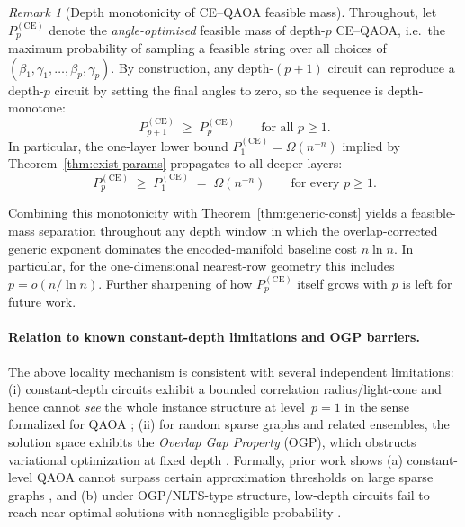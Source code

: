 \documentclass[a4paper,onecolumn,11pt,unpublished]{quantumarticle}
\theoremstyle{remark}
\newtheorem{remark}[theorem]{Remark}
\begin{document}
\begin{remark}[Depth monotonicity of CE--QAOA feasible mass]
\label{rem:ce-depth}
Throughout, let $P_p^{\mathrm{(CE)}}$ denote the \emph{angle-optimised}
feasible mass of depth-$p$ CE--QAOA, i.e.\ the maximum probability of
sampling a feasible string over all choices of $(\beta_1,\gamma_1,\dots,\beta_p,\gamma_p)$.
By construction, any depth-$(p{+}1)$ circuit can reproduce a depth-$p$ circuit by setting the final angles to zero, so the sequence is depth-monotone:
\[
  P_{p+1}^{\mathrm{(CE)}} \;\ge\; P_p^{\mathrm{(CE)}}\qquad\text{for all }p\ge 1.
\]
In particular, the one-layer lower bound
$P_{1}^{\mathrm{(CE)}} = \Omega(n^{-n})$ implied by Theorem~\ref{thm:exist-params} propagates to all deeper layers:
\[
  P_p^{\mathrm{(CE)}} \;\ge\; P_{1}^{\mathrm{(CE)}}
  \;=\; \Omega(n^{-n})
  \qquad\text{for every } p\ge 1.
\]

Combining this monotonicity with Theorem~\ref{thm:generic-const} yields a feasible-mass separation throughout any depth window in which the overlap-corrected generic exponent dominates the encoded-manifold baseline cost \(n\ln n\). In particular, for the one-dimensional nearest-row geometry this includes
\(p=o(n/\ln n)\).  Further sharpening of how \(P_p^{(\mathrm{CE})}\) itself grows with \(p\) is left for future work.
\end{remark}


\paragraph{Relation to known constant-depth limitations and OGP barriers.}
The above locality mechanism is consistent with several independent limitations:
(i) constant-depth circuits exhibit a bounded correlation radius/light-cone \cite{Hastings2010Locality} and hence cannot \emph{see} the whole instance structure at level~$p{=}1$ in the sense formalized for QAOA \cite{FarhiGamarnikGutmann2020WholeGraph,BravyiGossetKonig2018};
(ii) for random sparse graphs and related ensembles, the solution space exhibits the \emph{Overlap Gap Property} (OGP), which obstructs variational optimization at fixed depth \cite{Anschuetz_2024, GamarnikZadik2022QAOAOGP, FarhiGamarnikGutmann2020WholeGraph, Bravyi_2020}.
Formally, prior work shows (a) constant-level QAOA cannot surpass certain approximation thresholds on large sparse graphs \cite{Basso2022, Bravyi_2020}, and (b) under OGP/NLTS-type structure, low-depth circuits fail to reach near-optimal solutions with nonnegligible probability \cite{GamarnikZadik2022QAOAOGP,Anschuetz_2024}.
\end{document}
